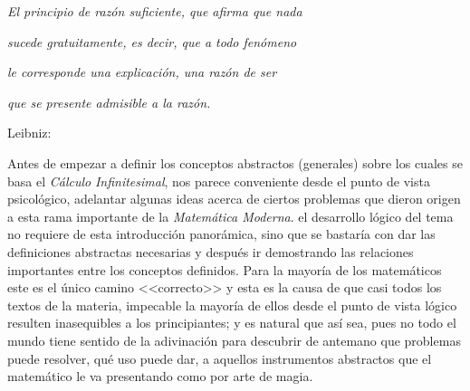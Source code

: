


\vspace*{-1.5cm}
 
\begin{flushright}
\textit{\footnotesize{}El principio de razón suficiente, que afirma
que nada}
\par\end{flushright}{\footnotesize \par}

\begin{flushright}
\textit{\footnotesize{}sucede gratuitamente, es decir, que a todo
fenómeno }
\par\end{flushright}{\footnotesize \par}

\begin{flushright}
\textit{\footnotesize{}le corresponde una explicación, una razón de
ser }
\par\end{flushright}{\footnotesize \par}

\begin{flushright}
\textit{\footnotesize{}que se presente admisible a la razón. }
\par\end{flushright}{\footnotesize \par}

\begin{flushright}
Leibniz: 
\par\end{flushright}

\vspace*{10mm}

Antes de empezar a definir los conceptos abstractos (generales) sobre
los cuales se basa el \textsl{Cálculo} \textsl{Infinitesimal}, nos
parece conveniente desde el punto de vista psicológico, adelantar
algunas ideas acerca de ciertos problemas que dieron origen a esta
rama importante de la \textsl{Matemática Moderna}. el desarrollo lógico
del tema no requiere de esta introducción panorámica, sino que se
bastaría con dar las definiciones abstractas necesarias y después
ir demostrando las relaciones importantes entre los conceptos definidos.
Para la mayoría de los matemáticos este es el único camino <<correcto>>
y esta es la causa de que casi todos los textos de la materia, impecable
la mayoría de ellos desde el punto de vista lógico resulten inasequibles
a los principiantes; y es natural que así sea, pues no todo el mundo
tiene sentido de la adivinación para descubrir de antemano que problemas
puede resolver, qué uso puede dar, a aquellos instrumentos abstractos
que el matemático le va presentando como por arte de magia.

